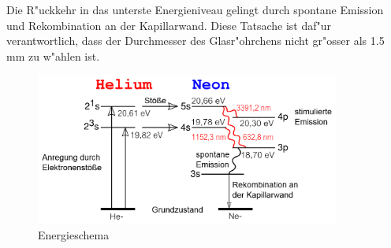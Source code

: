 \begin{refsection}
Die R"uckkehr in das unterste Energieniveau  gelingt durch spontane Emission 
und Rekombination an der Kapillarwand. Diese Tatsache ist daf"ur 
verantwortlich, dass der Durchmesser des Glasr"ohrchens nicht gr"osser als 1.5 
mm zu w"ahlen ist. 


\begin{figure}
\centering
\includegraphics[width = 10cm]{laser/bilder/Energieschema.png}
\caption{Energieschema \cite{He-Ne-Laser-Energieschema}}
\label{Energieschema}
\end{figure}

\printbibliography[heading=subbibliography]

\end{refsection}

